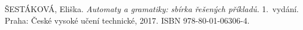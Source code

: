 \documentclass{article}
\begin{document}

\begin{thebibliography}{9}
ŠESTÁKOVÁ, Eliška. 
\textit{Automaty a gramatiky: sbírka řešených příkladů}.
1.~vydání. Praha: České vysoké učení technické, 2017. ISBN 978-80-01-06306-4.
\end{thebibliography}

\end{document}

